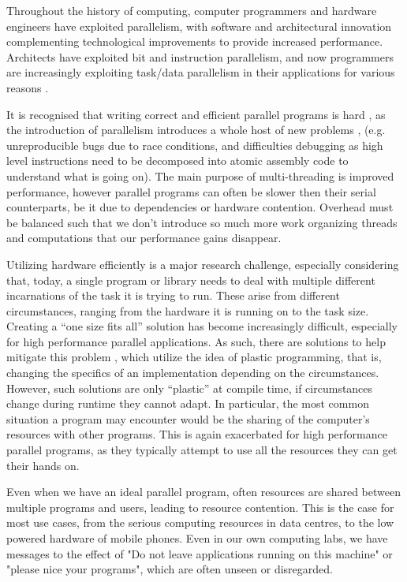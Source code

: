 
Throughout the history of computing, computer programmers and hardware engineers have exploited parallelism, with software and architectural innovation complementing technological improvements to provide increased performance. Architects have exploited bit and instruction parallelism, and now programmers are increasingly exploiting task/data parallelism in their applications \cite{concurrency_revolution} for various reasons \cite{free_lunch}.

It is recognised that writing correct and efficient parallel programs is hard \cite{parallel_challenges}, as the introduction of parallelism introduces a whole host of new problems \cite{sequential_to_parallel}, (e.g. unreproducible bugs due to race conditions, and difficulties debugging as high level instructions need to be decomposed into atomic assembly code to understand what is going on). The main purpose of multi-threading is improved performance, however parallel programs can often be slower then their serial counterparts, be it due to dependencies or hardware contention. Overhead must be balanced such that we don't introduce so much more work organizing threads and computations that our performance gains disappear.

Utilizing hardware efficiently is a major research challenge, especially considering that, today, a single program or library needs to deal with multiple different incarnations of the task it is trying to run. These arise from different circumstances, ranging from the hardware it is running on to the task size. Creating a ``one size fits all'' solution has become increasingly difficult, especially for high performance parallel applications. As such, there are solutions to help mitigate this problem \cite{petabricks}, which utilize the idea of plastic programming, that is, changing the specifics of an implementation depending on the circumstances. However, such solutions are only ``plastic'' at compile time, if circumstances change during runtime they cannot adapt. In particular, the most common situation a program may encounter would be the sharing of the computer's resources with other programs. This is again exacerbated for high performance parallel programs, as they typically attempt to use all the resources they can get their hands on.

Even when we have an ideal parallel program, often resources are shared between multiple programs and users, leading to resource contention. This is the case for most use cases, from the serious computing resources in data centres, to the low powered hardware of mobile phones. Even in our own computing labs, we have messages to the effect of "Do not leave applications running on this machine" or "please nice your programs", which are often unseen or disregarded.

